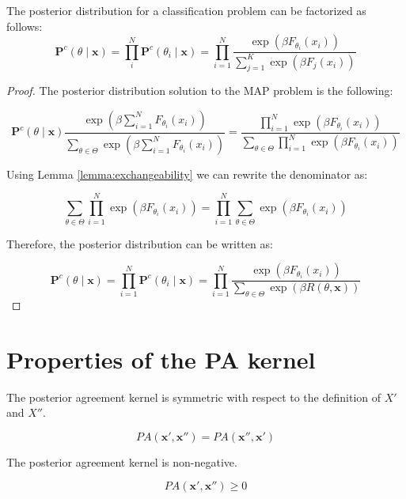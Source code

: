 \begin{theorem}

    The posterior distribution for a classification problem can be factorized as follows:
    $$
    \mathbf{P}^c(\theta \mid \bm{x}) = \prod_i^N  \mathbf{P}^c(\theta_i \mid \bm{x}) = \prod_{i=1}^N \frac{\exp \left ( \beta F_{\theta_i}(x_i) \right )}{\sum_{j=1}^K \exp \left ( \beta F_j(x_i) \right )}
    $$
\end{theorem}

\begin{proof}
    The posterior distribution solution to the MAP problem is the following:

    $$
    \mathbf{P}^c(\theta \mid \bm{x}) \frac{\exp \left ( \beta \sum_{i=1}^N F_{\theta_i}(x_i) \right )}{\sum_{\theta \in \Theta} \exp \left ( \beta \sum_{i=1}^N F_{\theta_i}(x_i) \right )}
    = \frac{\prod_{i=1}^N \exp \left ( \beta F_{\theta_i}(x_i) \right )}{\sum_{\theta \in \Theta} \prod_{i=1}^N \exp \left ( \beta  F_{\theta_i}(x_i) \right )}
    $$

    Using Lemma \ref{lemma:exchangeability} we can rewrite the denominator as:

    $$
    \sum_{\theta \in \Theta} \prod_{i=1}^N \exp \left ( \beta  F_{\theta_i}(x_i) \right ) = \prod_{i=1}^N \sum_{\theta \in \Theta} \exp \left ( \beta  F_{\theta_i}(x_i) \right )
    $$

    Therefore, the posterior distribution can be written as:

    $$
    \mathbf{P}^c(\theta \mid \bm{x}) = \prod_{i=1}^N  \mathbf{P}^c(\theta_i \mid \bm{x}) = \prod_{i=1}^N \frac{\exp \left ( \beta F_{\theta_i}(x_i) \right )}{\sum_{\theta \in \Theta} \exp \left ( \beta R(\theta, \bm{x}) \right )}
    $$

\end{proof}

\section{Properties of the PA kernel}\label{sec:kernel}

\begin{theorem}
    The posterior agreement kernel is symmetric with respect to the definition of $X'$ and $X''$.

    $$
    PA(\bm{x}', \bm{x}'') = PA(\bm{x}'', \bm{x}')
    $$
\end{theorem}

\begin{theorem}
    The posterior agreement kernel is non-negative.

    $$
    PA(\bm{x}', \bm{x}'') \geq 0
    $$  
\end{theorem}


